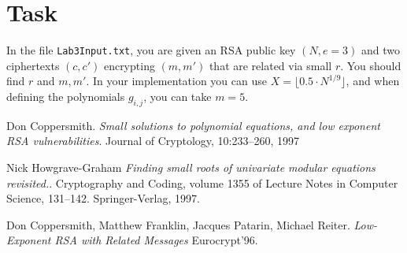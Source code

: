 \documentclass[11pt]{exam}
\theoremstyle{definition}
\begin{document}
\section{Task}

In the file \texttt{Lab3Input.txt}, you are given an RSA public key $(N,e=3)$  and two ciphertexts $(c,c')$  encrypting  $(m,m')$ that are related via small $r$. You should find $r$ and $m, m'$. In your implementation you can use $X=\lfloor 0.5 \cdot N^{1/9} \rfloor$, and when defining the polynomials $g_{i,j}$, you can take $m=5$.

	
	\begin{thebibliography}{9}
		Don Coppersmith.
		\textit{Small solutions to polynomial equations, and low exponent RSA vulnerabilities}. 
		Journal of Cryptology, 10:233--260, 1997
		
		Nick Howgrave-Graham
		\textit{Finding small roots of univariate modular equations revisited.}. 
		Cryptography and Coding, volume 1355 of Lecture Notes in Computer Science,  131--142.
		Springer-Verlag, 1997.
		
		Don Coppersmith, Matthew Franklin, Jacques Patarin, Michael Reiter.
		\textit{Low-Exponent RSA with Related Messages}
		Eurocrypt'96. 
	\end{thebibliography}	
		
\end{document}
